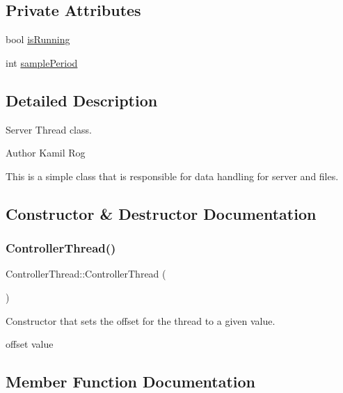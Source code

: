 \subsection*{Private Attributes}
\begin{DoxyCompactItemize}
\item 
bool \hyperlink{classControllerThread_ad00ac5cba8e74a5ea69d5caace8c9954}{is\+Running}
\item 
int \hyperlink{classControllerThread_a5dcd0069c7d31295c7e1e598c31fadf7}{sample\+Period}
\end{DoxyCompactItemize}


\subsection{Detailed Description}
Server Thread class. 

\begin{DoxyAuthor}{Author}
Kamil Rog
\end{DoxyAuthor}
This is a simple class that is responsible for data handling for server and files. 

\subsection{Constructor \& Destructor Documentation}
\mbox{\label{classControllerThread_a00cd6502504f5f1e680e6be3f60a987d}} 
\subsubsection{\texorpdfstring{Controller\+Thread()}{ControllerThread()}}
{\footnotesize\ttfamily Controller\+Thread\+::\+Controller\+Thread (\begin{DoxyParamCaption}{ }\end{DoxyParamCaption})\hspace{0.3cm}{\ttfamily [inline]}}

Constructor that sets the offset for the thread to a given value.

offset value 

\subsection{Member Function Documentation}
\mbox{\label{classCppThread_a8ff0fda6b913cc53764caef0e1200f3f}} 
